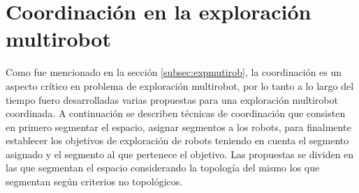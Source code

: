 




\section{Coordinación en la exploración multirobot}
Como fue mencionado en la sección \ref{subsec:expmutirob}, la coordinación es un aspecto crítico en problema de exploración multirobot, por lo tanto a lo largo del tiempo fuero desarrolladas varias propuestas para una exploración multirobot coordinada. A continuación se describen técnicas de coordinación que consisten en primero segmentar el espacio, asignar segmentos a los robots, para finalmente establecer los objetivos de exploración de robots teniendo en cuenta el segmento asignado y el segmento al que pertenece el objetivo. Las propuestas se dividen en las que segmentan el espacio considerando la topología del mismo los que segmentan según criterios no topológicos.
